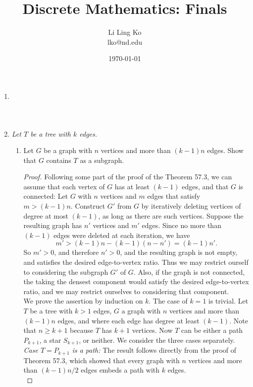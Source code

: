 \documentclass{article}
\begin{document}
\title{Discrete Mathematics: Finals}
\author{Li Ling Ko\\ lko@nd.edu}
\date{\today}
\maketitle

\begin{enumerate}
  \item \it

  \item \it Let $T$ be a tree with $k$ edges.
    \begin{enumerate}
      \item Let $G$ be a graph with $n$ vertices and more than $(k-1)n$
        edges. Show that $G$ contains $T$ as a subgraph.

        \begin{proof}
          Following some part of the proof of the Theorem 57.3, we can
          assume that each vertex of $G$ has at least $(k-1)$ edges, and
          that $G$ is connected: Let $G$ with $n$ vertices and $m$ edges
          that satisfy $m>(k-1)n$. Construct $G'$ from $G$ by iteratively
          deleting vertices of degree at most $(k-1)$, as long as there are
          such vertices. Suppose the resulting graph has $n'$ vertices and
          $m'$ edges. Since no more than $(k-1)$ edges were deleted at each
          iteration, we have
          \[m' >(k-1)n-(k-1)(n-n') =(k-1)n'.\]
          So $m'>0$, and therefore $n'>0$, and the resulting graph is not
          empty, and satisfies the desired edge-to-vertex ratio. Thus we
          may restrict ourself to considering the subgraph $G'$ of $G$.
          Also, if the graph is not connected, the taking the densest
          component would satisfy the desired edge-to-vertex ratio, and we
          may restrict ourselves to considering that component. \\

          We prove the assertion by induction on $k$. The case of $k=1$ is
          trivial. Let $T$ be a tree with $k>1$ edges, $G$ a graph with $n$
          vertices and more than $(k-1)n$ edges, and where each edge has
          degree at least $(k-1)$. Note that $n\geq k+1$ because $T$ has
          $k+1$ vertices. Now $T$ can be either a path $P_{k+1}$, a star
          $S_{k+1}$, or neither. We consider the three cases separately. \\

          \textit{Case $T=P_{k+1}$ is a path:} The result follows directly
          from the proof of Theorem 57.3, which showed that every graph
          with $n$ vertices and more than $(k-1)n/2$ edges embeds a path
          with $k$ edges. \\


\end{proof}
\end{enumerate}
\end{enumerate}
\end{document}
